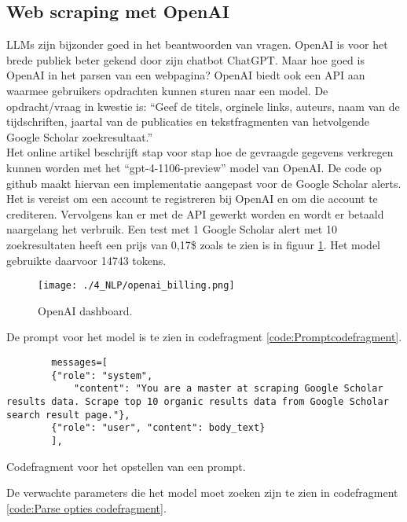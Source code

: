 \subsection{Web scraping met OpenAI}
LLMs zijn bijzonder goed in het beantwoorden van vragen. OpenAI is voor het brede publiek beter gekend door zijn chatbot ChatGPT. Maar hoe goed is OpenAI in het parsen van een webpagina? OpenAI biedt ook een API \autocite{Openaideveloperplatform2025} aan waarmee gebruikers opdrachten kunnen sturen naar een model. De opdracht/vraag in kwestie is: ``Geef de titels, orginele links, auteurs, naam van de tijdschriften, jaartal van de publicaties en tekstfragmenten van hetvolgende Google Scholar zoekresultaat.''\\
Het online artikel \textcite{Serpapiai2025} beschrijft stap voor stap hoe de gevraagde gegevens verkregen kunnen worden met het ``gpt-4-1106-preview'' model van OpenAI.
De code op github \textcite{Depaepeopenai2025} maakt hiervan een implementatie aangepast voor de Google Scholar alerts.
Het is vereist om een account te registreren bij OpenAI en om die account te crediteren. Vervolgens kan er met de API gewerkt worden en wordt er betaald naargelang het verbruik.
Een test met 1 Google Scholar alert met 10 zoekresultaten heeft een prijs van 0,17\$ zoals te zien is in figuur \ref{fig:OpenAI dashboard}. Het model gebruikte daarvoor 14743 tokens. 
\begin{figure}
    \centering
    \texttt{[image: ./4\_NLP/openai\_billing.png]}
    \caption[OpenAI dashboard.]{\label{fig:OpenAI dashboard}OpenAI dashboard.}
\end{figure}
De prompt voor het model is te zien in codefragment \ref{code:Promptcodefragment}.
\begin{listing}
    \begin{verbatim}
        messages=[
        {"role": "system",
            "content": "You are a master at scraping Google Scholar results data. Scrape top 10 organic results data from Google Scholar search result page."},
        {"role": "user", "content": body_text}
        ],
    \end{verbatim}
    \caption[Prompt codefragment]{Codefragment voor het opstellen van een prompt.}
    \label{code:Promptcodefragment}
\end{listing}
De verwachte parameters die het model moet zoeken zijn te zien in codefragment \ref{code:Parse opties codefragment}.

